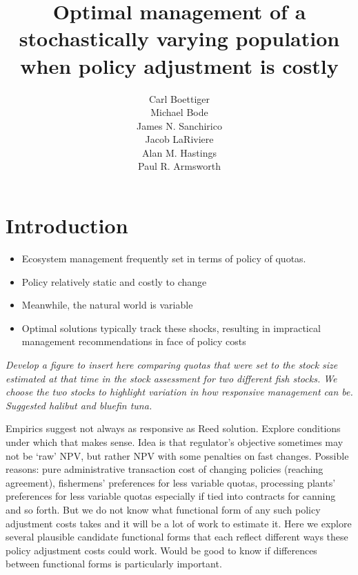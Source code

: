 \documentclass{article}\usepackage{graphicx, color}
\begin{document}

\title{Optimal management of a stochastically varying population when policy adjustment is costly} 


\author{Carl Boettiger    \\
       Michael Bode      \\
        James N. Sanchirico \\
Jacob LaRiviere \\
Alan M. Hastings\\
Paul R. Armsworth
}




\maketitle


\section{Introduction}



\begin{itemize}
  \item Ecosystem management frequently set in terms of policy of quotas. 
  \item Policy relatively static and costly to change
  \item Meanwhile, the natural world is variable
  \item Optimal solutions typically track these shocks, resulting in impractical management recommendations in face of policy costs
\end{itemize}

\emph{Develop a figure to insert here comparing quotas that were set to the stock size estimated at that time in the stock assessment for two different fish stocks. We choose the two stocks to highlight variation in how responsive management can be. Suggested halibut and bluefin tuna.}

Empirics suggest not always as responsive as Reed solution. Explore conditions under which that makes sense. Idea is that regulator’s objective sometimes may not be `raw' NPV, but rather NPV with some penalties on fast changes. Possible reasons: pure administrative transaction cost of changing policies (reaching agreement), fishermens' preferences for less variable quotas, processing plants' preferences for less variable quotas especially if tied into contracts for canning and so forth. But we do not know what functional form of any such policy adjustment costs takes and it will be a lot of work to estimate it. Here we explore several plausible candidate functional forms that each reflect different ways these policy adjustment costs could work. Would be good to know if differences between functional forms is particularly important.
\end{document}
